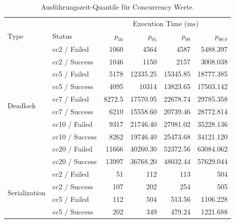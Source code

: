 
\begin{table}[htbp]
	\centering
	\caption{Ausführungszeit-Quantile für Concurrency Werte.}
	\label{tab:cc-quantiles}
	\scriptsize
	\setlength{\tabcolsep}{4pt}
	\begin{tabular}{llrrrr}
		\toprule
		& & \multicolumn{4}{c}{Execution Time (ms)} \\
		Type & Status & $p_{50}$ & $p_{95}$ & $p_{99}$ & $p_{99.9}$ \\
		\midrule

		\multirow{10}{*}{Deadlock}
		& cc2 / Failed
		& 1060 & 4564 & 4587 & 5488.397 \\
		& cc2 / Success
		& 1046 & 1150 & 2157 & 3008.038 \\

		& cc5 / Failed
		& 5178 & 12335.25 & 15345.85 & 18777.385 \\
		& cc5 / Success
		& 4095 & 10314 & 13823.65 & 17503.142 \\

		& cc7 / Failed
		& 8272.5 & 17570.95 & 22678.74 & 29785.358 \\
		& cc7 / Success
		& 6210 & 15558.60 & 20739.46 & 28772.814 \\

		& cc10 / Failed
		& 9317 & 21746.40 & 27981.02 & 35228.136 \\
		& cc10 / Success
		& 8262 & 19746.40 & 25473.68 & 34121.120 \\

		& cc20 / Failed
		& 11666 & 40260.30 & 52372.56 & 63084.062 \\
		& cc20 / Success
		& 13997 & 36768.20 & 48032.44 & 57629.044 \\

		\midrule

		\multirow{10}{*}{Serialization}
		& cc2 / Failed
		& 51 & 112 & 113 & 504 \\
		& cc2 / Success
		& 107 & 202 & 254 & 505 \\

		& cc5 / Failed
		& 112 & 504 & 513.56 & 1106.228 \\
		& cc5 / Success
		& 202 & 349 & 479.24 & 1221.688 \\


\end{tabular}
\end{table}
